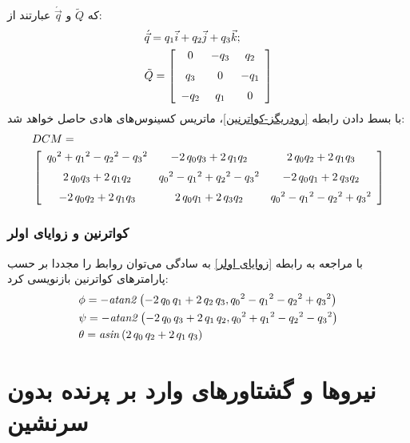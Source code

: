که $ \tilde{Q} $ و $ \acute{\vec{q}} $ عبارتند از:
\begin{equation}
\begin{split}
& \acute{\vec{q}}=q_1\vec{i}+q_2\vec{j}+q_3\vec{k};\\
& \tilde{Q}=\left[ \begin {array}{ccc} 0&-q_{3}&q_{2}\\ \noalign{\medskip}q_{3}&0
&-q_{1}\\ \noalign{\medskip}-q_{2}&q_{1}&0\end {array} \right]
\end{split}
\end{equation}
با بسط دادن رابطه \eqref{رودریگز-کواترنین}، ماتریس کسینوس‌های هادی حاصل خواهد شد:
\begin{equation}
\begin{split}
&DCM=\\
 &\left[ \begin {array}{ccc} {q_{{0}}}^{2}+{q_{{
1}}}^{2}-{q_{{2}}}^{2}-{q_{{3}}}^{2}&-2\,q_{{0}}q_{{3}}+2\,q_{{1}}q_{{
2}}&2\,q_{{0}}q_{{2}}+2\,q_{{1}}q_{{3}}\\ \noalign{\medskip}2\,q_{{0}}
q_{{3}}+2\,q_{{1}}q_{{2}}&{q_{{0}}}^{2}-{q_{{1}}}^{2}+{q_{{2}}}^{2}-{q
_{{3}}}^{2}&-2\,q_{{0}}q_{{1}}+2\,q_{{3}}q_{{2}}\\ \noalign{\medskip}-
2\,q_{{0}}q_{{2}}+2\,q_{{1}}q_{{3}}&2\,q_{{0}}q_{{1}}+2\,q_{{3}}q_{{2
}}&{q_{{0}}}^{2}-{q_{{1}}}^{2}-{q_{{2}}}^{2}+{q_{{3}}}^{2}\end {array}
 \right]
 \end{split}
\end{equation}
\subsubsection{کواترنین و زوایای اولر}
با مراجعه به رابطه \eqref{زوایای اولر} به سادگی می‌توان روابط را مجددا بر حسب پارامترهای کواترنین بازنویسی کرد:
\begin{equation}
\begin{split}
& \phi=-{\it atan2} \left( -2\,q_{0}\,q_{1}+2\,q_{2}\,q_{3},{q_{0}}^{2}-{q
_{1}}^{2}-{q_{2}}^{2}+{q_{3}}^{2} \right) \\
& \psi=-{\it atan2} \left( -2\,q_{0}\,q_{3}+2\,q_{1}\,q_{2},{q_{0}}^{2}+{q
_{1}}^{2}-{q_{2}}^{2}-{q_{3}}^{2} \right) \\
& \theta={\it asin} \left( 2\,q_{0}\,q_{2}+2\,q_{1}\,q_{3} \right) 
\end{split}
\end{equation}
\section{ نیروها و گشتاورهای وارد بر پرنده بدون سرنشین  }


